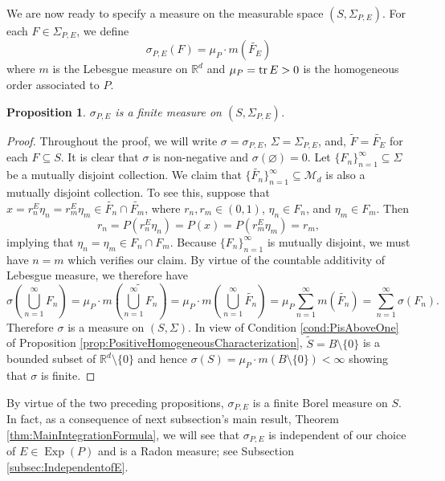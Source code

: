 \documentclass[11pt]{article}
\newtheorem{proposition}[theorem]{Proposition}
\theoremstyle{remark}
\newcommand\Exp{\operatorname{Exp}}
\begin{document}
\noindent We are now ready to specify a measure on the measurable space $(S,\Sigma_{P,E})$. For each $F\in \Sigma_{P,E}$, we define
\begin{equation*}
\sigma_{P,E}(F)=\mu_P\cdot m(\widetilde{F_E})
\end{equation*}
where $m$ is the Lebesgue measure on $\mathbb{R}^d$ and $\mu_P=\tr E>0$ is the homogeneous order associated to $P$.

\begin{proposition}\label{prop:sigmaisameaure}
$\sigma_{P,E}$ is a finite measure on $(S,\Sigma_{P,E})$.
\end{proposition}
\begin{proof}

\noindent Throughout the proof, we will write $\sigma=\sigma_{P,E}$, $\Sigma=\Sigma_{P,E}$, and, $\widetilde{F}=\widetilde{F_E}$ for each $F\subseteq S$. It is clear that $\sigma$ is non-negative and $\sigma(\varnothing)=0$. Let $\{ F_n  \}^\infty_{n=1} \subseteq \Sigma $ be a mutually disjoint collection. We claim that $\{ \widetilde{F_n} \}_{n=1}^\infty\subseteq\mathcal{M}_d$ is also a mutually disjoint collection. To see this, suppose that $x = r_n^E \eta_n = r_m^E \eta_m\in \widetilde{F_n}\cap\widetilde{F_m}$, where $r_n,r_m \in (0,1)$, $\eta_n \in F_n$, and $\eta_m \in F_m $. Then
\begin{equation*}
    r_n = P(r_n^E \eta_n) = P(x) = P(r_m^E \eta_m) = r_m,
\end{equation*}
implying that $\eta_n = \eta_m\in F_n\cap F_m$. Because $\{F_n\}_{n=1}^\infty$ is mutually disjoint, we must have $n=m$ which verifies our claim. By virtue of the countable additivity of Lebesgue measure, we therefore have
\begin{equation*}
\sigma\left(\bigcup_{n=1}^\infty F_n\right)
    = \mu_P\cdot m\left( \widetilde{\bigcup^\infty_{n=1} F_n } \right)=\mu_P\cdot m\left( \bigcup^\infty_{n=1}\widetilde{F_n} \right)
    = \mu_P\sum^\infty_{n=1} m(\widetilde{F_n})
    = \sum^\infty_{n=1}\sigma(F_n).
\end{equation*}
Therefore $\sigma$ is a measure on $(S,\Sigma)$. In view of Condition \ref{cond:PisAboveOne} of Proposition \ref{prop:PositiveHomogeneousCharacterization}, $\widetilde{S}=B\setminus\{0\}$ is a bounded subset of $\mathbb{R}^d\setminus\{0\}$ and hence $\sigma(S)=\mu_P\cdot m(B\setminus\{0\})<\infty$ showing that $\sigma$ is finite.
\end{proof}

\noindent By virtue of the two preceding propositions, $\sigma_{P,E}$ is a finite Borel measure on $S$. In fact, as a consequence of next subsection's main result, Theorem \ref{thm:MainIntegrationFormula}, we will see that $\sigma_{P,E}$ is independent of our choice of $E\in\Exp(P)$ and is a Radon measure; see Subsection \ref{subsec:IndependentofE}.
\end{document}
